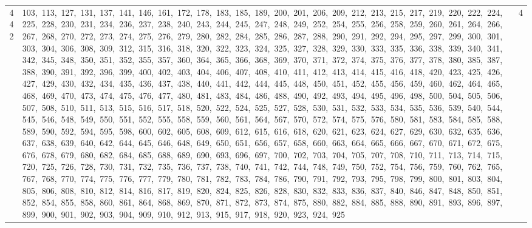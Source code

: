 \begin{longtable}{c|p{}|r}
442 & 103,\ 113,\ 127,\ 131,\ 137,\ 141,\ 146,\ 161,\ 172,\ 178,\ 183,\ 185,\ 189,\ 200,\ 201,\ 206,\ 209,\ 212,\ 213,\ 215,\ 217,\ 219,\ 220,\ 222,\ 224,\ 225,\ 228,\ 230,\ 231,\ 234,\ 236,\ 237,\ 238,\ 240,\ 243,\ 244,\ 245,\ 247,\ 248,\ 249,\ 252,\ 254,\ 255,\ 256,\ 258,\ 259,\ 260,\ 261,\ 264,\ 266,\ 267,\ 268,\ 270,\ 272,\ 273,\ 274,\ 275,\ 276,\ 279,\ 280,\ 282,\ 284,\ 285,\ 286,\ 287,\ 288,\ 290,\ 291,\ 292,\ 294,\ 295,\ 297,\ 299,\ 300,\ 301,\ 303,\ 304,\ 306,\ 308,\ 309,\ 312,\ 315,\ 316,\ 318,\ 320,\ 322,\ 323,\ 324,\ 325,\ 327,\ 328,\ 329,\ 330,\ 333,\ 335,\ 336,\ 338,\ 339,\ 340,\ 341,\ 342,\ 345,\ 348,\ 350,\ 351,\ 352,\ 355,\ 357,\ 360,\ 364,\ 365,\ 366,\ 368,\ 369,\ 370,\ 371,\ 372,\ 374,\ 375,\ 376,\ 377,\ 378,\ 380,\ 385,\ 387,\ 388,\ 390,\ 391,\ 392,\ 396,\ 399,\ 400,\ 402,\ 403,\ 404,\ 406,\ 407,\ 408,\ 410,\ 411,\ 412,\ 413,\ 414,\ 415,\ 416,\ 418,\ 420,\ 423,\ 425,\ 426,\ 427,\ 429,\ 430,\ 432,\ 434,\ 435,\ 436,\ 437,\ 438,\ 440,\ 441,\ 442,\ 444,\ 445,\ 448,\ 450,\ 451,\ 452,\ 455,\ 456,\ 459,\ 460,\ 462,\ 464,\ 465,\ 468,\ 469,\ 470,\ 473,\ 474,\ 475,\ 476,\ 477,\ 480,\ 481,\ 483,\ 484,\ 486,\ 488,\ 490,\ 492,\ 493,\ 494,\ 495,\ 496,\ 498,\ 500,\ 504,\ 505,\ 506,\ 507,\ 508,\ 510,\ 511,\ 513,\ 515,\ 516,\ 517,\ 518,\ 520,\ 522,\ 524,\ 525,\ 527,\ 528,\ 530,\ 531,\ 532,\ 533,\ 534,\ 535,\ 536,\ 539,\ 540,\ 544,\ 545,\ 546,\ 548,\ 549,\ 550,\ 551,\ 552,\ 555,\ 558,\ 559,\ 560,\ 561,\ 564,\ 567,\ 570,\ 572,\ 574,\ 575,\ 576,\ 580,\ 581,\ 583,\ 584,\ 585,\ 588,\ 589,\ 590,\ 592,\ 594,\ 595,\ 598,\ 600,\ 602,\ 605,\ 608,\ 609,\ 612,\ 615,\ 616,\ 618,\ 620,\ 621,\ 623,\ 624,\ 627,\ 629,\ 630,\ 632,\ 635,\ 636,\ 637,\ 638,\ 639,\ 640,\ 642,\ 644,\ 645,\ 646,\ 648,\ 649,\ 650,\ 651,\ 656,\ 657,\ 658,\ 660,\ 663,\ 664,\ 665,\ 666,\ 667,\ 670,\ 671,\ 672,\ 675,\ 676,\ 678,\ 679,\ 680,\ 682,\ 684,\ 685,\ 688,\ 689,\ 690,\ 693,\ 696,\ 697,\ 700,\ 702,\ 703,\ 704,\ 705,\ 707,\ 708,\ 710,\ 711,\ 713,\ 714,\ 715,\ 720,\ 725,\ 726,\ 728,\ 730,\ 731,\ 732,\ 735,\ 736,\ 737,\ 738,\ 740,\ 741,\ 742,\ 744,\ 748,\ 749,\ 750,\ 752,\ 754,\ 756,\ 759,\ 760,\ 762,\ 765,\ 767,\ 768,\ 770,\ 774,\ 775,\ 776,\ 777,\ 779,\ 780,\ 781,\ 782,\ 783,\ 784,\ 786,\ 790,\ 791,\ 792,\ 793,\ 795,\ 798,\ 799,\ 800,\ 801,\ 803,\ 804,\ 805,\ 806,\ 808,\ 810,\ 812,\ 814,\ 816,\ 817,\ 819,\ 820,\ 824,\ 825,\ 826,\ 828,\ 830,\ 832,\ 833,\ 836,\ 837,\ 840,\ 846,\ 847,\ 848,\ 850,\ 851,\ 852,\ 854,\ 855,\ 858,\ 860,\ 861,\ 864,\ 868,\ 869,\ 870,\ 871,\ 872,\ 873,\ 874,\ 875,\ 880,\ 882,\ 884,\ 885,\ 888,\ 890,\ 891,\ 893,\ 896,\ 897,\ 899,\ 900,\ 901,\ 902,\ 903,\ 904,\ 909,\ 910,\ 912,\ 913,\ 915,\ 917,\ 918,\ 920,\ 923,\ 924,\ 925 & 4 \\

\end{longtable}

